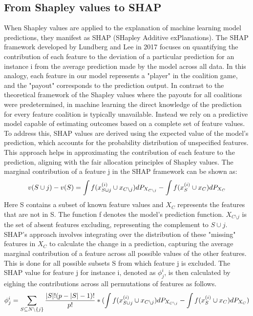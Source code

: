 \documentclass[12pt]{article}
\begin{document}
\subsection{From Shapley values to SHAP}
When Shapley values are applied to the explanation of machine learning model predictions, they manifest as SHAP (SHapley Additive exPlanations).
The SHAP framework developed by Lundberg and Lee in 2017 focuses on quantifying the contribution of each feature to the deviation of a particular prediction for an instance i from the average prediction made by the model across all data.
In this analogy, each feature in our model represents a "player" in the coalition game, and the "payout" corresponds to the prediction output. 
In contrast to the theoretical framework of the Shapley values where the payouts for all coalitions were predetermined, in machine learning the direct knowledge of the prediction for every feature coalition is typically unavailable. Instead we rely on a predictive model capable of estimating outcomes based on a complete set of feature values.
To address this, SHAP values are derived using the expected value of the model's prediction, which accounts for the probability distribution of unspecified features. This approach helps in approximating the contribution of each feature to the prediction, aligning with the fair allocation principles of Shapley values.
The marginal contribution of a feature j in the SHAP framework can be shown as:
$$v(S \cup j) - v(S) = \int f(x_{S \cup j}^{(i)} \cup x_{C\setminus j})dP_{X_{C\setminus j}} \\
- \int f(x_S^{(i)} \cup x_C)dP_{X_C}$$
Here S contains a subset of known feature values and $X_C$ represents  the features that are not in S. The function f denotes the model's prediction function. $X_{C\setminus j}$ is the set of absent features excluding, representing the complement to $S \cup j$.
SHAP’s approach involves integrating over the distribution of these "missing" features in $X_C$ to calculate the change in a prediction, capturing the average marginal contribution of a feature across all possible values of the other features. This is done for all possible subsets S from which feature j is excluded.
The SHAP value for feature j for instance i, denoted as $\phi^{i}_j$, is then calculated by eighing the contributions across all permutations of features as follows.
$$	\phi^{i}_j = \sum_{S \subseteq N\backslash\{j\}} \frac{|S|!(p - |S| - 1)!}{p!} * ( \int f(x_{S \cup j}^{(i)} \cup x_{C\setminus j})dP_{X_{C\setminus j}} \\
- \int f(x_S^{(i)} \cup x_C)dP_{X_C})$$ 
\end{document}
